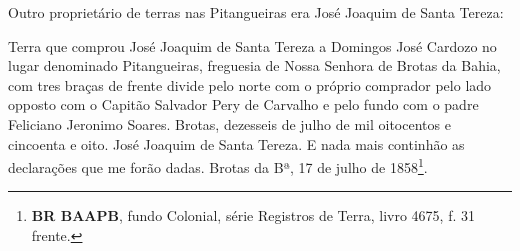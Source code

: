 Outro proprietário de terras nas Pitangueiras era José Joaquim de Santa Tereza:

\begin{citacao}
Terra que comprou José Joaquim de Santa Tereza a Domingos José Cardozo no lugar denominado Pitangueiras, freguesia de Nossa Senhora de Brotas da Bahia, com tres braças de frente divide pelo norte com o próprio comprador pelo lado opposto com o Capitão Salvador Pery de Carvalho e pelo fundo com o padre Feliciano Jeronimo Soares. Brotas, dezesseis de julho de mil oitocentos e cincoenta e oito. José Joaquim de Santa Tereza. E nada mais continhão as declarações que me forão dadas. Brotas da Bª, 17 de julho de 1858\footnote{\textbf{BR BAAPB}, fundo Colonial, série Registros de Terra, livro 4675, f. 31 frente.}.
\end{citacao}

